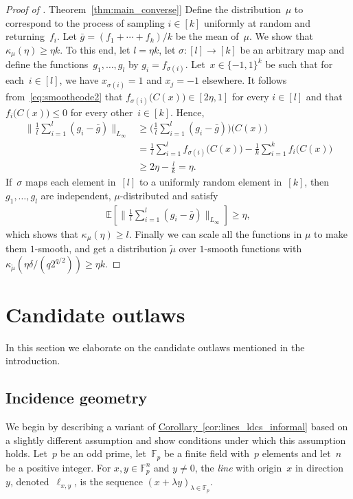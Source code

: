 \documentclass[11pt]{article}
\numberwithin{equation}{section}
\theoremstyle{definition}
\theoremstyle{plain}
\newcommand{\expref}[2]{\hyperref[#2]{#1~\ref{#2}}}
\newcommand{\pmset}[1]{\{-1,1\}^{#1}} %
\newcommand{\Exp}{{\mathbb{E}}}
\newcommand{\F}{{\mathbb{F}}}
\begin{document}
\begin{proof}[Proof of \expref{Theorem}{thm:main_converse}]
Define the distribution~$\mu$ to correspond to the process of sampling $i\in[k]$ uniformly at random and returning~$f_i$.
Let $\bar g = (f_1 + \cdots + f_k)/k$ be the mean of~$\mu$.
We show that $\kappa_\mu(\eta) \geq \eta k$.
To this end, let $l = \eta k$, let $\sigma:[l]\to[k]$ be an arbitrary map and define the functions~$g_1,\dots,g_l$ by $g_i = f_{\sigma(i)}$.
Let~$x\in\pmset{k}$ be such that for each~$i\in[l]$, we have $x_{\sigma(i)} = 1$ and $x_j = -1$ elsewhere.
It follows from~\eqref{eq:smoothcode2} that
$f_{\sigma(i)}\big(C(x)\big) \in [2\eta,1]$ for every $i\in[l]$ and that $f_{i}\big(C(x)\big) \leq 0$ for every other~$i\in[k]$.
Hence,
\begin{align*}
\Big\|
\frac{1}{l}\sum_{i=1}^l(g_i - \bar g)
\Big\|_{L_\infty}
&\geq
\Big(
\frac{1}{l}\sum_{i=1}^l(g_i - \bar g)
\Big)
\big(C(x)\big)\\
&=
\frac{1}{l}\sum_{i=1}^lf_{\sigma(i)}\big(C(x)\big)
-
\frac{1}{k}\sum_{i=1}^kf_{i}\big(C(x)\big)\\
&\geq
2\eta - \frac{l}{k}= \eta.
\end{align*}
If~$\sigma$ maps each element in~$[l]$ to a uniformly random element in~$[k]$, then $g_1,\dots,g_l$ are independent, $\mu$-distributed and satisfy
\begin{align*}
\Exp\left[
\Big\|
\frac{1}{l}\sum_{i=1}^l(g_i - \bar g)
\Big\|_{L_\infty}
\right]
\geq
\eta,
\end{align*}
which shows that $\kappa_\mu(\eta) \geq l$. Finally we can scale all the functions in $\mu$ to make them $1$-smooth, and get a distribution $\tilde{\mu}$ over $1$-smooth functions with $\kappa_{\tilde{\mu}}(\eta \delta/(q2^{q/2}))\ge \eta k$.
\end{proof}






\section{Candidate outlaws}
\label{sec:candidates}
In this section we elaborate on the candidate outlaws mentioned in the introduction.

\subsection{Incidence geometry}
\label{sec:lines}

We begin by describing a variant of \expref{Corollary}{cor:lines_ldcs_informal} based on a slightly different assumption and show conditions under which this assumption holds.
Let~$p$ be an odd prime, let~$\F_p$ be a finite field with~$p$ elements and let~$n$ be a positive integer.
%
For $x,y\in \F_p^n$ and $y\ne 0$, the \emph{line} with origin~$x$ in direction~$y$, denoted~$\ell_{x,y}$, is the sequence $(x + \lambda y)_{\lambda \in \F_p}$.
%
\end{document}
